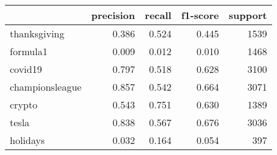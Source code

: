 \begin{tabular}{lrrrr}
\toprule
{} &  precision &  recall &  f1-score &  support \\
\midrule
thanksgiving    &      0.386 &   0.524 &     0.445 &     1539 \\
formula1        &      0.009 &   0.012 &     0.010 &     1468 \\
covid19         &      0.797 &   0.518 &     0.628 &     3100 \\
championsleague &      0.857 &   0.542 &     0.664 &     3071 \\
crypto          &      0.543 &   0.751 &     0.630 &     1389 \\
tesla           &      0.838 &   0.567 &     0.676 &     3036 \\
holidays        &      0.032 &   0.164 &     0.054 &      397 \\
\bottomrule
\end{tabular}
